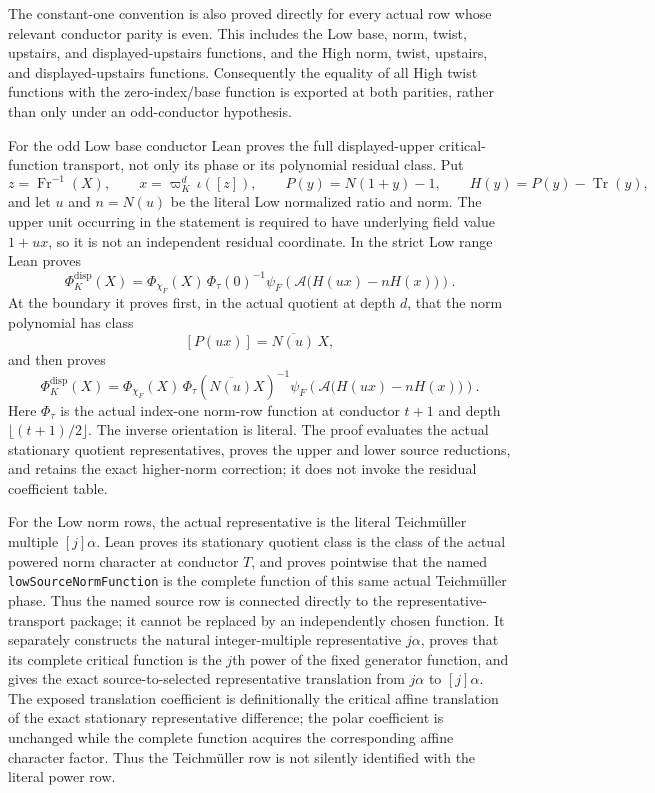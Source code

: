 \begin{definition}
The constant-one convention is also proved directly for every actual row
whose relevant conductor parity is even.  This includes the Low base, norm,
twist, upstairs, and displayed-upstairs functions, and the High norm, twist,
upstairs, and displayed-upstairs functions.  Consequently the equality of
all High twist functions with the zero-index/base function is exported at
both parities, rather than only under an odd-conductor hypothesis.

For the odd Low base conductor Lean proves the full displayed-upper
critical-function transport, not only its phase or its polynomial residual
class.  Put
\[
 z=\operatorname{Fr}^{-1}(X),\qquad
 x=\varpi_K^d\,\iota([z]),\qquad
 P(y)=N(1+y)-1,\qquad H(y)=P(y)-\operatorname{Tr}(y),
\]
and let $u$ and $n=N(u)$ be the literal Low normalized ratio and norm.  The
upper unit occurring in the statement is required to have underlying field
value $1+ux$, so it is not an independent residual coordinate.  In the
strict Low range Lean proves
\[
 \Phi_K^{\mathrm{disp}}(X)=
 \Phi_{\chi_F}(X)\,\Phi_\tau(0)^{-1}
 \psi_F\!\left(\mathcal A\bigl(H(ux)-nH(x)\bigr)\right).
\]
At the boundary it proves first, in the actual quotient at depth $d$, that
the norm polynomial has class
\[
 [P(ux)]=\overline{N(u)}\,X,
\]
and then proves
\[
 \Phi_K^{\mathrm{disp}}(X)=
 \Phi_{\chi_F}(X)\,
 \Phi_\tau\!\left(\overline{N(u)}X\right)^{-1}
 \psi_F\!\left(\mathcal A\bigl(H(ux)-nH(x)\bigr)\right).
\]
Here $\Phi_\tau$ is the actual index-one norm-row function at conductor
$t+1$ and depth $\lfloor(t+1)/2\rfloor$.  The inverse orientation is
literal.  The proof evaluates the actual stationary quotient
representatives, proves the upper and lower source reductions, and retains
the exact higher-norm correction; it does not invoke the residual coefficient
table.

For the Low norm rows, the actual representative is the literal
Teichm\"uller multiple $[j]\alpha$.  Lean proves its stationary quotient
class is the class of the actual powered norm character at conductor $T$,
and proves pointwise that the named \texttt{lowSourceNormFunction} is the
complete function of this same actual Teichm\"uller phase.  Thus the named
source row is connected directly to the representative-transport package;
it cannot be replaced by an independently chosen function.
It separately constructs the natural integer-multiple representative
$j\alpha$, proves that its complete critical function is the $j$th power of
the fixed generator function, and gives the exact source-to-selected
representative translation from $j\alpha$ to $[j]\alpha$.  The exposed
translation coefficient is definitionally the critical affine translation
of the exact stationary representative difference; the polar coefficient
is unchanged while the complete function acquires the corresponding affine
character factor.  Thus the Teichm\"uller row is not silently identified
with the literal power row.


\end{definition}
